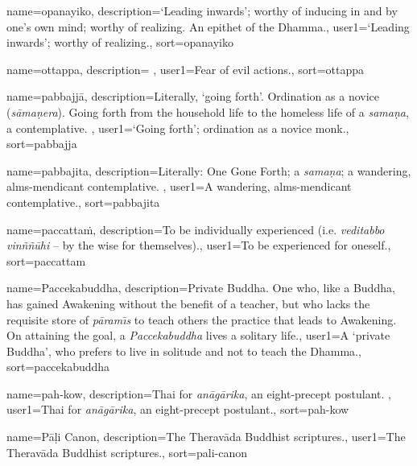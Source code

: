 {
name=opanayiko,
description={`Leading inwards'; worthy of inducing in and by one's own mind; worthy of realizing. An epithet of the Dhamma.},
user1={`Leading inwards'; worthy of realizing.},
sort={opanayiko}
}

{
name=ottappa,
description={\nopostdesc \protect \seepre %
\protect {}%
\protect \seepost %
},
user1={Fear of evil actions.},
sort={ottappa}
}

{
name=pabbajj\=a,
description={Literally, `going forth'. Ordination as a novice (\textit{s\=ama\d{n}era}). Going forth from the household life to the homeless life of a \textit{sama\d{n}a}, a contemplative. \protect \seepre %
\protect {}%
\protect \seepost %
},
user1={`Going forth'; ordination as a novice monk.},
sort={pabbajja}
}

{
name=pabbajita,
description={Literally: One Gone Forth; a \textit{sama\d{n}a}; a wandering, alms-mendicant contemplative. \protect \seepre %
\protect {}%
\protect \seepost %
},
user1={A wandering, alms-mendicant contemplative.},
sort={pabbajita}
}

{
name=paccatta\.m,
description={To be individually experienced (i.e. \textit{veditabbo vin\~n\~n\=uhi} -- by the wise for themselves).},
user1={To be experienced for oneself.},
sort={paccattam}
}

{
name={Paccekabuddha},
description={Private Buddha. One who, like a Buddha, has gained Awakening without the benefit of a teacher, but who lacks the requisite store of \textit{p\=aram\={\i}s} to teach others the practice that leads to Awakening. On attaining the goal, a \textit{Paccekabuddha} lives a solitary life.},
user1={A `private Buddha', who prefers to live in solitude and not to teach the Dhamma.},
sort={paccekabuddha}
}

{
name={pah-kow},
description={Thai for \textit{an\=ag\=arika}, an eight-precept postulant. \protect \seepre %
\protect {}%
\protect \seepost %
},
user1={Thai for \textit{an\=ag\=arika}, an eight-precept postulant.},
sort={pah-kow}
}

{
name={P\=a\d{l}i Canon},
description={The Therav\=ada Buddhist scriptures.},
user1={The Therav\=ada Buddhist scriptures.},
sort={pali-canon}
}

